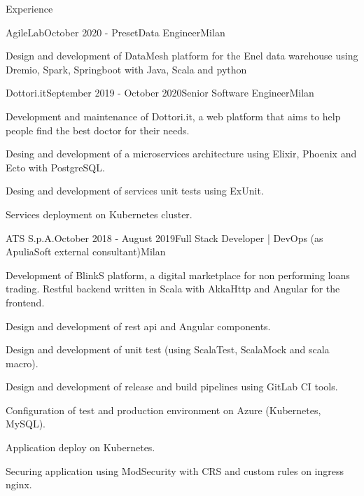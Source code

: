 \documentclass{resume} %
\begin{document}

\begin{rSection}{Experience}

\begin{rSubsection}{AgileLab}{October 2020 - Preset}{Data Engineer}{Milan}
\item Design and development of DataMesh platform for the Enel data warehouse using Dremio, Spark, Springboot with Java, Scala and python
\end{rSubsection}

\begin{rSubsection}{Dottori.it}{September 2019 - October 2020}{Senior Software Engineer}{Milan}
\item Development and maintenance of Dottori.it, a web platform that aims to help people find the best doctor for their needs.
\item Desing and development of a microservices architecture using Elixir, Phoenix and Ecto with PostgreSQL.
\item Desing and development of services unit tests using ExUnit.
\item Services deployment on Kubernetes cluster.
\end{rSubsection}

\begin{rSubsection}{ATS S.p.A.}{October 2018 - August 2019}{Full Stack Developer | DevOps (as ApuliaSoft external consultant)}{Milan}
\item Development of BlinkS platform, a digital marketplace for non performing loans trading.
Restful backend written in Scala with AkkaHttp and Angular for the frontend.
\item Design and development of rest api and Angular components.
\item Design and development of unit test (using ScalaTest, ScalaMock and scala macro).
\item Design and development of release and build pipelines using GitLab CI tools.
\item Configuration of test and production environment on Azure (Kubernetes, MySQL).
\item Application deploy on Kubernetes.
\item Securing application using ModSecurity with CRS and custom rules on ingress nginx.
\end{rSubsection}


\end{rSection}
\end{document}
